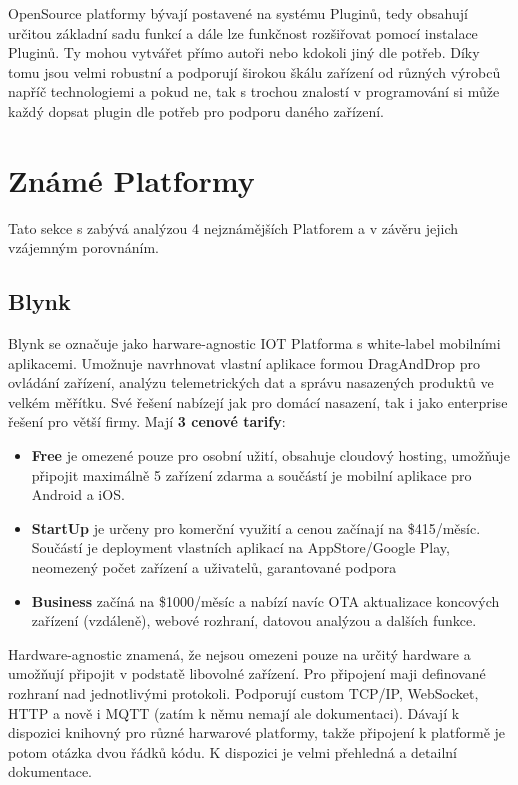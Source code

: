 \documentclass[thesis=B,czech]{FITthesis}[2019/12/23]
\begin{document}
OpenSource platformy bývají postavené na systému Pluginů, tedy obsahují určitou základní sadu funkcí a dále lze funkčnost rozšiřovat pomocí instalace Pluginů. Ty mohou vytvářet přímo autoři nebo kdokoli jiný dle potřeb. Díky tomu jsou velmi robustní a podporují širokou škálu zařízení od různých výrobců napříč technologiemi a pokud ne, tak s trochou znalostí v programování si může každý dopsat plugin dle potřeb pro podporu daného zařízení.
 

\section{Známé Platformy}  %
Tato sekce s zabývá analýzou 4 nejznámějších Platforem a v závěru jejich vzájemným porovnáním.

\subsection{Blynk}
Blynk se označuje jako harware-agnostic IOT Platforma s white-label mobilními aplikacemi. Umožnuje navrhnovat vlastní aplikace formou DragAndDrop pro ovládání zařízení, analýzu telemetrických dat a správu nasazených produktů ve velkém měřítku. Své řešení nabízejí jak pro domácí nasazení, tak i jako enterprise řešení pro větší firmy. Mají \textbf{3 cenové tarify}:
\begin{itemize}
\item \textbf{Free} je omezené pouze pro osobní užití, obsahuje cloudový hosting, umožňuje připojit maximálně 5 zařízení zdarma a součástí je mobilní aplikace pro Android a iOS.
\item \textbf{StartUp} je určeny pro komerční využití a cenou začínají na \$415/měsíc. Součástí je deployment vlastních aplikací na AppStore/Google Play, neomezený počet zařízení a uživatelů, garantované podpora
\item \textbf{Business} začíná na \$1000/měsíc a nabízí navíc OTA aktualizace koncových zařízení (vzdáleně), webové rozhraní, datovou analýzou a dalších funkce.
\end{itemize}

Hardware-agnostic znamená, že nejsou omezeni pouze na určitý hardware a umožňují připojit v podstatě libovolné zařízení. Pro připojení maji definované rozhraní nad jednotlivými protokoli. Podporují custom TCP/IP, WebSocket, HTTP a nově i MQTT (zatím k němu nemají ale dokumentaci). Dávají k dispozici knihovný pro různé harwarové platformy, takže připojení k platformě je potom otázka dvou řádků kódu. K dispozici je velmi přehledná a detailní dokumentace.
\end{document}
